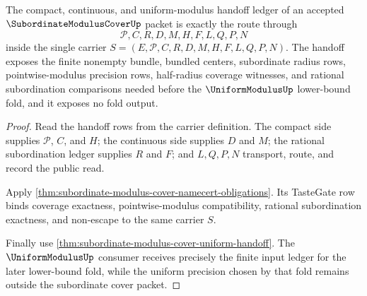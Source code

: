 \begin{theorem}
\label{thm:subordinate-modulus-cover-ledger-handoff-obligation}
The compact, continuous, and uniform-modulus handoff ledger of an accepted $\SubordinateModulusCoverUp$ packet is exactly the route through
$$
\mathcal{P},C,R,D,M,H,F,L,Q,P,N
$$
inside the single carrier $S=(E,\mathcal{P},C,R,D,M,H,F,L,Q,P,N)$. The handoff exposes the finite nonempty bundle, bundled centers, subordinate radius rows, pointwise-modulus precision rows, half-radius coverage witnesses, and rational subordination comparisons needed before the $\UniformModulusUp$ lower-bound fold, and it exposes no fold output.
\end{theorem}
\begin{proof}
Read the handoff rows from the carrier definition. The compact side supplies $\mathcal{P}$, $C$, and $H$; the continuous side supplies $D$ and $M$; the rational subordination ledger supplies $R$ and $F$; and $L,Q,P,N$ transport, route, and record the public read.

Apply \autoref{thm:subordinate-modulus-cover-namecert-obligations}. Its TasteGate row binds coverage exactness, pointwise-modulus compatibility, rational subordination exactness, and non-escape to the same carrier $S$.

Finally use \autoref{thm:subordinate-modulus-cover-uniform-handoff}. The $\UniformModulusUp$ consumer receives precisely the finite input ledger for the later lower-bound fold, while the uniform precision chosen by that fold remains outside the subordinate cover packet.
\end{proof}

